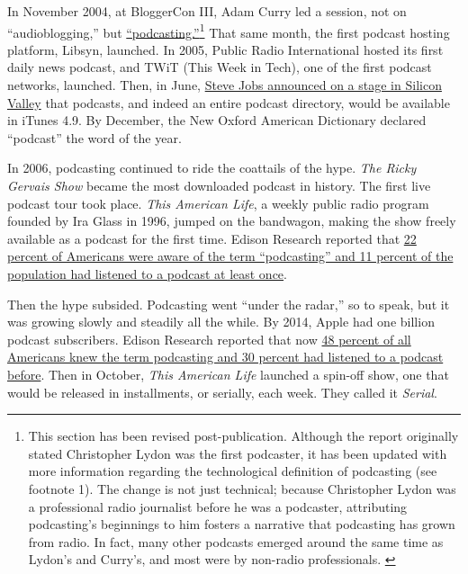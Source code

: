 \documentclass[notoc, symmetric, nobib, nols]{towcenter-guideto-book}
\begin{document}
In November 2004, at BloggerCon III, Adam Curry led a session, not on ``audioblogging,'' but \href{http://web.archive.org/web/20130729212422id_/http://itc.conversationsnetwork.org/shows/detail275.html}{``podcasting.''}\footnote{This section has been revised post-publication. Although the report originally stated Christopher Lydon was the first podcaster, it has been updated with more information regarding the technological definition of podcasting (see footnote 1). The change is not just technical; because Christopher Lydon was a professional radio journalist before he was a podcaster, attributing podcasting's beginnings to him fosters a narrative that podcasting has grown from radio. In fact, many other podcasts emerged around the same time as Lydon's and Curry's, and most were by non-radio professionals. \autocite{WINER}}\autocite{Solutions} That same month, the first podcast hosting platform, Libsyn, launched. In 2005, Public Radio International hosted its first daily news podcast, and TWiT (This Week in Tech), one of the first podcast networks, launched. Then, in June, \href{https://www.youtube.com/watch?v=K0KNLCbzZUw}{Steve Jobs announced on a stage in Silicon Valley} that podcasts, and indeed an entire podcast directory, would be available in iTunes 4.9.\autocite{JobsVideo} By December, the New Oxford American Dictionary declared ``podcast'' the word of the year.\autocite{PCHistoryWiki}

In 2006, podcasting continued to ride the coattails of the hype. \textit{The Ricky Gervais Show} became the most downloaded podcast in history. The first live podcast tour took place.\autocite{PCHistoryWiki} \textit{This American Life}, a weekly public radio program founded by Ira Glass in 1996, jumped on the bandwagon, making the show freely available as a podcast for the first time. Edison Research reported that \href{http://www.edisonresearch.com/the-podcast-consumer-2015/}{22 percent of Americans were aware of the term ``podcasting'' and 11 percent of the population had listened to a podcast at least once}.\autocite{EdPCconsumer}

Then the hype subsided. Podcasting went ``under the radar,'' so to speak, but it was growing slowly and steadily all the while. By 2014, Apple had one billion podcast subscribers. Edison Research reported that now \href{http://www.edisonresearch.com/the-podcast-consumer-2015/}{48 percent of all Americans knew the term podcasting and 30 percent had listened to a podcast before}.\autocite{EdPCconsumer} Then in October, \textit{This American Life} launched a spin-off show, one that would be released in installments, or serially, each week. They called it \textit{Serial}. 
\end{document}
